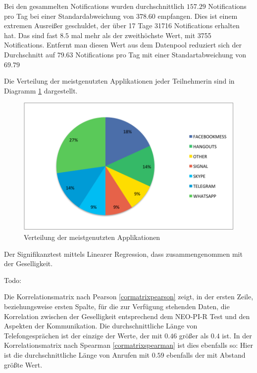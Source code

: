 Bei den gesammelten Notifications wurden durchschnittlich $157.29$ Notifications pro Tag bei einer Standardabweichung von $378.60$ empfangen.
Dies ist einem extremen Ausreißer geschuldet, der über 17 Tage 31716 Notifications erhalten hat. 
Das sind fast $8.5$ mal mehr als der zweithöchste Wert, mit 3755 Notifications.
Entfernt man diesen Wert aus dem Datenpool reduziert sich der Durchschnitt auf $79.63$ Notifications pro Tag mit einer Standartabweichung von $69.79$
\par
Die Verteilung der meistgenutzten Applikationen jeder Teilnehmerin sind in Diagramm \ref{fig:mostusedapp} dargestellt.

\begin{figure}[h]
    \centering
    \includegraphics{images/MostUsedApp.pdf}
    \caption{Verteilung der meistgenutzten Applikationen}
    \label{fig:mostusedapp}
\end{figure}

Der Signifikanztest mittels Linearer Regression, dass zusammengenommen mit der Geselligkeit.

Todo:

Die Korrelationsmatrix nach Pearson \ref{cormatrixpearson} zeigt, in der ersten Zeile, beziehungsweise ersten Spalte, für die zur Verfügung stehenden Daten, die Korrelation zwischen der Geselligkeit entsprechend dem NEO-PI-R Test und den Aspekten der Kommunikation.
Die durchschnittliche Länge von Telefongesprächen ist der einzige der Werte, der mit $0.46$ größer als $0.4$ ist.
In der Korrelationsmatrix nach Spearman \ref{cormatrixspearman} ist dies ebenfalls so: Hier ist die durchschnittliche Länge von Anrufen mit $0.59$ ebenfalls der mit Abstand größte Wert.


